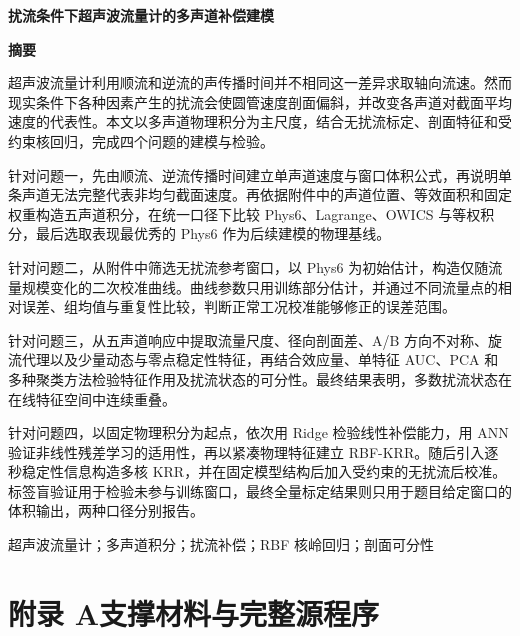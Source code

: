 \documentclass[fontset=windows, 12pt, a4paper]{ctexart}
\newcommand{\papertitle}[1]{%
  \thispagestyle{fancy}%
  \begin{center}
    {\fontsize{22pt}{26.4pt}\heiti\bfseries #1}
  \end{center}
  \vspace{0.55em}
}
\newcommand{\abstractcn}[2]{%
  \begin{center}{\fontsize{14pt}{16.8pt}\heiti\bfseries 摘\hspace{2em}要}\end{center}
  \vspace{0.3em}
  #1\par
  \vspace{0.3em}
  \noindent{\heiti\bfseries 关键词：}#2\par
  \newpage
}
\newcommand{\referencescn}{%
}
\newcommand{\appendixcn}{%
  \section*{附录 A\quad 支撑材料与完整源程序}%
  \clearpage
}
\begin{document}
\vspace*{0.55cm}
\papertitle{扰流条件下超声波流量计的多声道补偿建模}

\vspace{0.35cm}

\abstractcn{%
超声波流量计利用顺流和逆流的声传播时间并不相同这一差异求取轴向流速。然而现实条件下各种因素产生的扰流会使圆管速度剖面偏斜，并改变各声道对截面平均速度的代表性。本文以多声道物理积分为主尺度，结合无扰流标定、剖面特征和受约束核回归，完成四个问题的建模与检验。

针对问题一，先由顺流、逆流传播时间建立单声道速度与窗口体积公式，再说明单条声道无法完整代表非均匀截面速度。再依据附件中的声道位置、等效面积和固定权重构造五声道积分，在统一口径下比较 Phys6、Lagrange、OWICS 与等权积分，最后选取表现最优秀的 Phys6 作为后续建模的物理基线。

针对问题二，从附件中筛选无扰流参考窗口，以 Phys6 为初始估计，构造仅随流量规模变化的二次校准曲线。曲线参数只用训练部分估计，并通过不同流量点的相对误差、组均值与重复性比较，判断正常工况校准能够修正的误差范围。

针对问题三，从五声道响应中提取流量尺度、径向剖面差、A/B 方向不对称、旋流代理以及少量动态与零点稳定性特征，再结合效应量、单特征 AUC、PCA 和多种聚类方法检验特征作用及扰流状态的可分性。最终结果表明，多数扰流状态在在线特征空间中连续重叠。

针对问题四，以固定物理积分为起点，依次用 Ridge 检验线性补偿能力，用 ANN 验证非线性残差学习的适用性，再以紧凑物理特征建立 RBF-KRR。随后引入逐秒稳定性信息构造多核 KRR，并在固定模型结构后加入受约束的无扰流后校准。标签盲验证用于检验未参与训练窗口，最终全量标定结果则只用于题目给定窗口的体积输出，两种口径分别报告。%
}{%
超声波流量计；多声道积分；扰流补偿；RBF 核岭回归；剖面可分性%
}











\referencescn
\ifdefined\WordExport
\else
  \newpage
  \appendixcn
\fi
\end{document}
